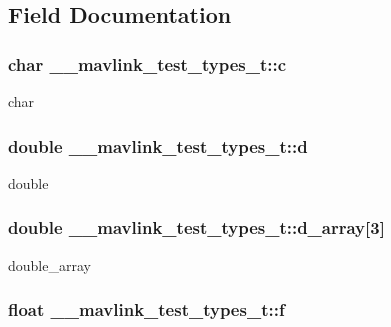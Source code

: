 \subsection{Field Documentation}
\hypertarget{struct____mavlink__test__types__t_aa40c20757144c710972466c624337241}{
\subsubsection[{c}]{\setlength{\rightskip}{0pt plus 5cm}char \+\_\+\+\_\+mavlink\+\_\+test\+\_\+types\+\_\+t\+::c}}\label{struct____mavlink__test__types__t_aa40c20757144c710972466c624337241}


char 

\hypertarget{struct____mavlink__test__types__t_a12ac797d1a0b3e329000fe19bcafb992}{
\subsubsection[{d}]{\setlength{\rightskip}{0pt plus 5cm}double \+\_\+\+\_\+mavlink\+\_\+test\+\_\+types\+\_\+t\+::d}}\label{struct____mavlink__test__types__t_a12ac797d1a0b3e329000fe19bcafb992}


double 

\hypertarget{struct____mavlink__test__types__t_a913629e4c956a6180cd9fdaaf8ccdb87}{
\subsubsection[{d\+\_\+array}]{\setlength{\rightskip}{0pt plus 5cm}double \+\_\+\+\_\+mavlink\+\_\+test\+\_\+types\+\_\+t\+::d\+\_\+array\mbox{[}3\mbox{]}}}\label{struct____mavlink__test__types__t_a913629e4c956a6180cd9fdaaf8ccdb87}


double\+\_\+array 

\hypertarget{struct____mavlink__test__types__t_ac9b429bd7a2999f549f6d41a30daae0a}{
\subsubsection[{f}]{\setlength{\rightskip}{0pt plus 5cm}float \+\_\+\+\_\+mavlink\+\_\+test\+\_\+types\+\_\+t\+::f}}\label{struct____mavlink__test__types__t_ac9b429bd7a2999f549f6d41a30daae0a}


